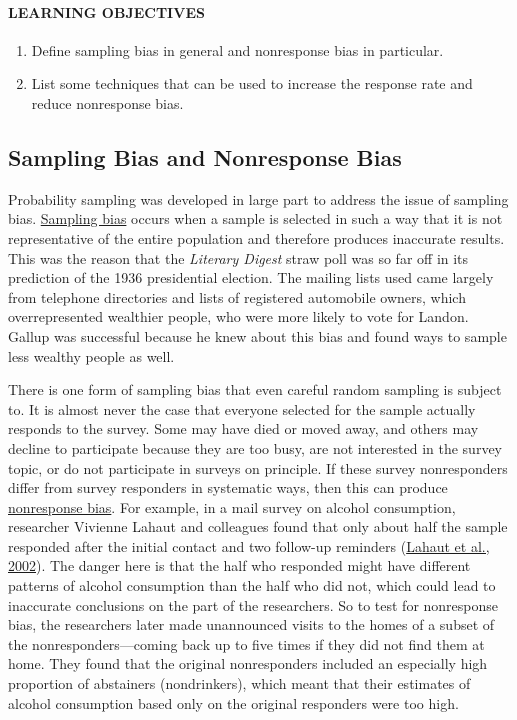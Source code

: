 \documentclass[
]{krantz}
\providecommand{\tightlist}{%
  \setlength{\itemsep}{0pt}\setlength{\parskip}{0pt}}
\begin{document}
\hypertarget{learning-objectives-19}{%
\paragraph*{LEARNING OBJECTIVES}\label{learning-objectives-19}}

\begin{enumerate}
\def\labelenumi{\arabic{enumi}.}
\tightlist
\item
  Define sampling bias in general and nonresponse bias in particular.
\item
  List some techniques that can be used to increase the response rate and reduce nonresponse bias.
\end{enumerate}

\hypertarget{sampling-bias-and-nonresponse-bias}{%
\subsection*{Sampling Bias and Nonresponse Bias}\label{sampling-bias-and-nonresponse-bias}}


Probability sampling was developed in large part to address the issue of sampling bias. \protect\hyperlink{sampling-bias-1}{Sampling bias} occurs when a sample is selected in such a way that it is not representative of the entire population and therefore produces inaccurate results. This was the reason that the \emph{Literary Digest} straw poll was so far off in its prediction of the 1936 presidential election. The mailing lists used came largely from telephone directories and lists of registered automobile owners, which overrepresented wealthier people, who were more likely to vote for Landon. Gallup was successful because he knew about this bias and found ways to sample less wealthy people as well.

There is one form of sampling bias that even careful random sampling is subject to. It is almost never the case that everyone selected for the sample actually responds to the survey. Some may have died or moved away, and others may decline to participate because they are too busy, are not interested in the survey topic, or do not participate in surveys on principle. If these survey nonresponders differ from survey responders in systematic ways, then this can produce \protect\hyperlink{nonresponse-bias}{nonresponse bias}. For example, in a mail survey on alcohol consumption, researcher Vivienne Lahaut and colleagues found that only about half the sample responded after the initial contact and two follow-up reminders (\protect\hyperlink{ref-lahaut2002non}{Lahaut et al., 2002}). The danger here is that the half who responded might have different patterns of alcohol consumption than the half who did not, which could lead to inaccurate conclusions on the part of the researchers. So to test for nonresponse bias, the researchers later made unannounced visits to the homes of a subset of the nonresponders---coming back up to five times if they did not find them at home. They found that the original nonresponders included an especially high proportion of abstainers (nondrinkers), which meant that their estimates of alcohol consumption based only on the original responders were too high.
\end{document}
